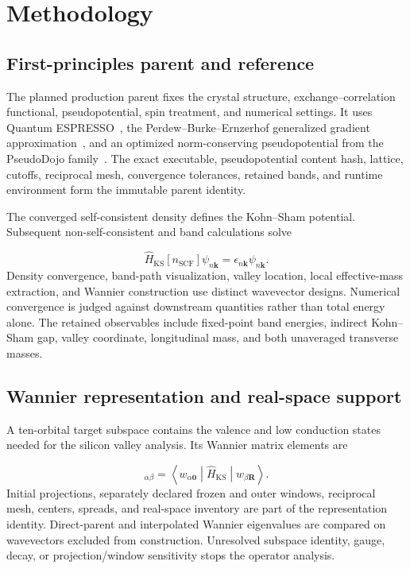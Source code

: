 \documentclass[11pt]{article}
\newenvironment{prospective}{\color{prospectivered}}{}
\begin{document}
\begin{prospective}
\section{Methodology}
\subsection{First-principles parent and reference}
The planned production parent fixes the crystal structure, exchange–correlation functional, pseudopotential, spin treatment, and numerical settings. It uses Quantum ESPRESSO~\cite{giannozzi2009}, the Perdew--Burke--Ernzerhof
generalized gradient approximation~\cite{perdew1996}, and an optimized norm-conserving
pseudopotential from the PseudoDojo family~\cite{hamann2013,vansetten2018}. The exact executable, pseudopotential content hash, lattice, cutoffs, reciprocal mesh, convergence tolerances, retained bands, and runtime environment form the immutable parent identity.

The converged self-consistent density defines the Kohn–Sham potential. Subsequent non-self-consistent and band calculations solve

\begin{equation*}
\hat H_{\mathrm{KS}}[n_{\mathrm{SCF}}]\psi_{n\mathbf k}
=
\epsilon_{n\mathbf k}\psi_{n\mathbf k}.
\tag{1}
\end{equation*}
Density convergence, band-path visualization, valley location, local effective-mass extraction, and Wannier construction use distinct wavevector designs. Numerical convergence is judged against downstream quantities rather than total energy alone. The retained observables include fixed-point band energies, indirect Kohn–Sham gap, valley coordinate, longitudinal mass, and both unaveraged transverse masses.

\subsection{Wannier representation and real-space support}
A ten-orbital target subspace contains the valence and low conduction states needed for the silicon valley analysis. Its Wannier matrix elements are

\begin{equation*}
[\mathbf H_{\mathrm W}(\mathbf R)]_{\alpha\beta}
=
\left\langle w_{\alpha\mathbf0}\middle|
\hat H_{\mathrm{KS}}
\middle|w_{\beta\mathbf R}\right\rangle.
\tag{2}
\end{equation*}
Initial projections, separately declared frozen and outer windows, reciprocal mesh, centers, spreads, and real-space inventory are part of the representation identity. Direct-parent and interpolated Wannier eigenvalues are compared on wavevectors excluded from construction. Unresolved subspace identity, gauge, decay, or projection/window sensitivity stops the operator analysis.


\end{prospective}
\end{document}
